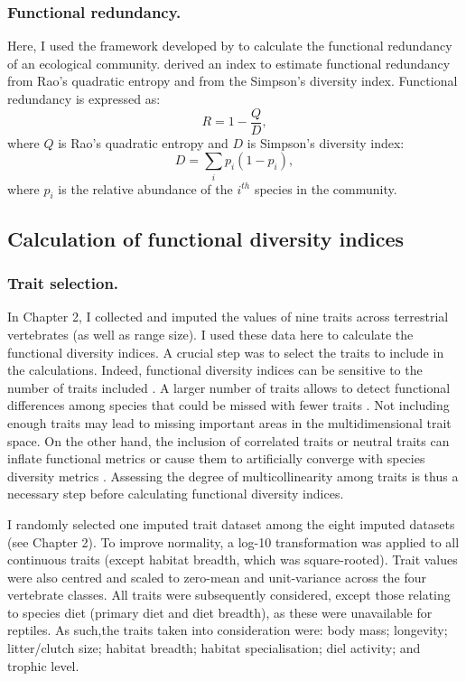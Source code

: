 \subsubsection{Functional redundancy.}
Here, I used the framework developed by \citet{Ricotta2016} to calculate the functional redundancy of an ecological community. \citet{Ricotta2016} derived an index to estimate functional redundancy from Rao's quadratic entropy and from the Simpson's diversity index. Functional redundancy is expressed as:
\begin{equation}
R=1-\frac{Q}{D},
\label{eqFRed}
\end{equation} 
where $Q$ is Rao's quadratic entropy and $D$ is Simpson's diversity index:
\begin{equation}
D=\sum_{i}p_{i}(1-p_{i}),
\end{equation} 
where $p_{i}$ is the relative abundance of the $i^{th}$ species in the community.

\subsection{Calculation of functional diversity indices}

\subsubsection{Trait selection.}
In Chapter 2, I collected and imputed the values of nine traits across terrestrial vertebrates (as well as range size). I used these data here to calculate the functional diversity indices. A crucial step was to select the traits to include in the calculations. Indeed, functional diversity indices can be sensitive to the number of traits included \citep{Mouillot2014, Cadotte2011}. A larger number of traits allows to detect functional differences among species that could be missed with fewer traits \citep{Petchey2002}. Not including enough traits may lead to missing important areas in the multidimensional trait space. On the other hand, the inclusion of correlated traits or neutral traits can inflate functional metrics or cause them to artificially converge with species diversity metrics \citep{Cadotte2011, Naeem2003}. Assessing the degree of multicollinearity among traits is thus a necessary step before calculating functional diversity indices. 

I randomly selected one imputed trait dataset among the eight imputed datasets (see Chapter 2). To improve normality, a log-10 transformation was applied to all continuous traits (except habitat breadth, which was square-rooted). Trait values were also centred and scaled to zero-mean and unit-variance across the four vertebrate classes. All traits were subsequently considered, except those relating to species diet (primary diet and diet breadth), as these were unavailable for reptiles. As such,the traits taken into consideration were: body mass; longevity; litter/clutch size; habitat breadth; habitat specialisation; diel activity; and trophic level.

